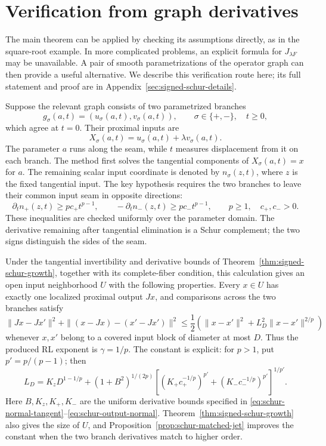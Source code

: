 \section{Verification from graph derivatives}
\label{sec:schur-seam-verifier}

The main theorem can be applied by checking its assumptions directly, as in
the square-root example.  In more complicated problems, an explicit formula
for \(J_{\lambda F}\) may be unavailable.  A pair of smooth parametrizations
of the operator graph can then provide a useful alternative.  We describe
this verification route here; its full statement and proof are in
Appendix~\ref{sec:signed-schur-details}.

Suppose the relevant graph consists of two parametrized branches
\[
 g_\sigma(a,t)=(u_\sigma(a,t),v_\sigma(a,t)),
 \qquad \sigma\in\{+,-\},\quad t\ge0,
\]
which agree at \(t=0\).  Their proximal inputs are
\[
 X_\sigma(a,t)=u_\sigma(a,t)+\lambda v_\sigma(a,t).
\]
The parameter \(a\) runs along the seam, while \(t\) measures displacement
from it on each branch.  The method first solves the tangential components
of \(X_\sigma(a,t)=x\) for \(a\).  The remaining scalar input coordinate
is denoted by \(n_\sigma(z,t)\), where \(z\) is the fixed tangential input.
The key hypothesis requires the two branches to leave their common input
seam in opposite directions:
\[
 \partial_t n_+(z,t)\ge p c_+t^{p-1},\qquad
 -\partial_t n_-(z,t)\ge p c_-t^{p-1},
 \qquad p\ge1,\quad c_+,c_->0.
\]
These inequalities are checked uniformly over the parameter domain.  The
derivative remaining after tangential elimination is a Schur complement;
the two signs distinguish the sides of the seam.

Under the tangential invertibility and derivative bounds of
Theorem~\ref{thm:signed-schur-growth}, together with its complete-fiber
condition, this calculation gives an open input neighborhood \(U\) with
the following properties.  Every \(x\in U\) has exactly one localized
proximal output \(Jx\), and comparisons across the two branches satisfy
\begin{equation}
 \|Jx-Jx'\|^2+
 \|(x-Jx)-(x'-Jx')\|^2
 \le\frac12\left(\|x-x'\|^2+
                     L_D^2\|x-x'\|^{2/p}\right)
 \label{eq:schur-main-J-estimate}
\end{equation}
whenever \(x,x'\) belong to a covered input block of diameter at most
\(D\).  Thus the produced RL exponent is \(\gamma=1/p\).
The constant is explicit: for \(p>1\), put \(p'=p/(p-1)\); then
\[
 L_D=K_zD^{1-1/p}+(1+B^2)^{1/(2p)}
 \left[(K_+c_+^{-1/p})^{p'}+
       (K_-c_-^{-1/p})^{p'}\right]^{1/p'}.
\]
Here \(B,K_z,K_+,K_-\) are the uniform derivative bounds specified in
\eqref{eq:schur-normal-tangent}--\eqref{eq:schur-output-normal}.
Theorem~\ref{thm:signed-schur-growth} also gives the size of \(U\), and
Proposition~\ref{prop:schur-matched-jet} improves the constant when the
two branch derivatives match to higher order.

